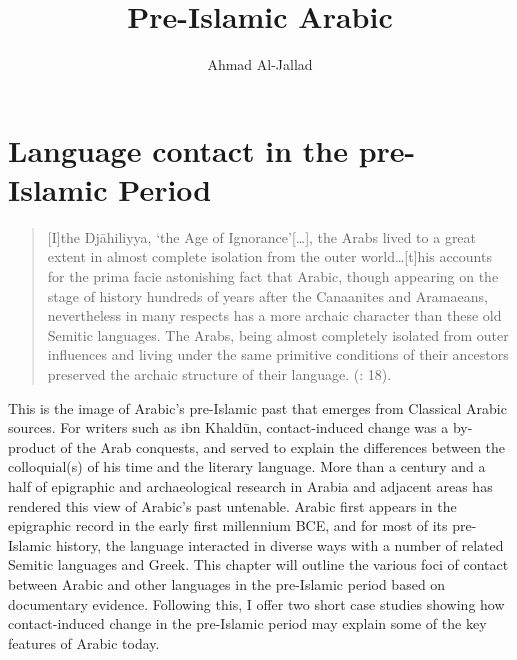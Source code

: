\documentclass[output=paper]{langsci/langscibook}
\author{Ahmad Al-Jallad\affiliation{The Ohio State University}}
\title{Pre-Islamic Arabic}
\begin{document}
  
\section{Language contact in the pre-Islamic Period}

\begin{quote}
[I]the Djāhiliyya, ‘the Age of Ignorance’[…], the Arabs lived to a great extent in almost complete isolation from the outer world…[t]his accounts for the prima facie astonishing fact that Arabic, though appearing on the stage of history hundreds of years after the Canaanites and Aramaeans, nevertheless in many respects has a more archaic character than these old Semitic languages. The Arabs, being almost completely isolated from outer influences and living under the same primitive conditions of their ancestors preserved the archaic structure of their language. (\citealt{Blau1981}: 18).
\end{quote}
This is the image of Arabic’s pre-Islamic past that emerges from Classical Arabic sources. For writers such as ibn Khaldūn, contact-induced change was a by-product of the Arab conquests, and served to explain the differences between the colloquial(s) of his time and the literary language. More than a century and a half of epigraphic and archaeological research in Arabia and adjacent areas has rendered this view of Arabic’s past untenable. Arabic first appears in the epigraphic record in the early first millennium BCE, and for most of its pre-Islamic history, the language interacted in diverse ways with a number of related Semitic languages and Greek. This chapter will outline the various foci of contact between Arabic and other languages in the pre-Islamic period based on documentary evidence. Following this, I offer two short case studies showing how contact-induced change in the pre-Islamic period may explain some of the key features of Arabic today.   
\end{document}
